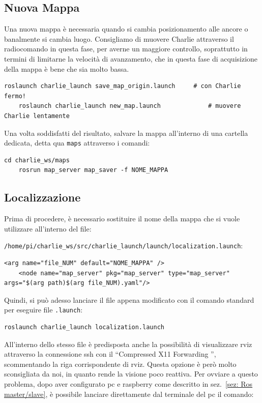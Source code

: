 \subsection{Nuova Mappa}
\label{sez: nuova mappa}
Una nuova mappa è necessaria quando si cambia posizionamento alle ancore o banalmente si cambia luogo. Consigliamo di muovere Charlie attraverso il radiocomando 
in questa fase, per averne un maggiore controllo, soprattutto in termini di limitarne la velocità di avanzamento, che in questa fase di acquisizione della mappa 
è bene che sia molto bassa.
\begin{lstlisting}[style=bash]
	roslaunch charlie_launch save_map_origin.launch		# con Charlie fermo!
	roslaunch charlie_launch new_map.launch 			# muovere Charlie lentamente
\end{lstlisting}

Una volta soddisfatti del risultato, salvare la mappa all'interno di una cartella dedicata, detta qua \verb|maps| attraverso i comandi:
\begin{lstlisting}[style=bash]
	cd charlie_ws/maps
	rosrun map_server map_saver -f NOME_MAPPA
\end{lstlisting}

\subsection{Localizzazione}
Prima di procedere, è necessario sostituire il nome della mappa che si vuole utilizzare all'interno del file:

\verb|/home/pi/charlie_ws/src/charlie_launch/launch/localization.launch|:

\begin{lstlisting}[style=xml, firstnumber=14]
	<arg name="file_NUM" default="NOME_MAPPA" />
	<node name="map_server" pkg="map_server" type="map_server" args="$(arg path)$(arg file_NUM).yaml"/>
\end{lstlisting}

Quindi, si può adesso lanciare il file appena modificato con il comando standard per eseguire file \verb|.launch|:
\begin{lstlisting}[style=bash]
	roslaunch charlie_launch localization.launch
\end{lstlisting}

All'interno dello stesso file è predisposta anche la possibilità di visualizzare rviz attraverso la connessione ssh con il ``Compressed X11 Forwarding '', 
scommentando la riga corrispondente di rviz. Questa opzione è però molto sconsigliata da noi, in quanto rende la visione poco reattiva. Per ovviare a questo 
problema, dopo aver configurato pc e raspberry come descritto in sez.~\ref{sez: Ros master/slave}, è possibile lanciare direttamente dal terminale del pc il comando:

